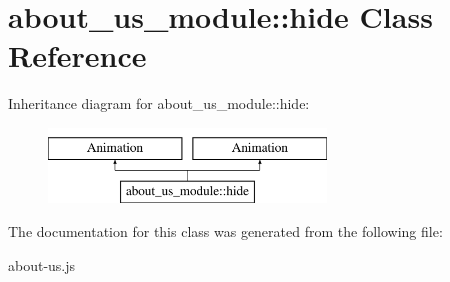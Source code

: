 \hypertarget{classabout__us__module_1_1hide}{\section{about\-\_\-us\-\_\-module\-:\-:hide Class Reference}
\label{classabout__us__module_1_1hide}
}
Inheritance diagram for about\-\_\-us\-\_\-module\-:\-:hide\-:\begin{figure}[H]
\begin{center}
\leavevmode
\includegraphics[height=2.000000cm]{classabout__us__module_1_1hide}
\end{center}
\end{figure}


The documentation for this class was generated from the following file\-:\begin{DoxyCompactItemize}
\item 
about-\/us.\-js\end{DoxyCompactItemize}
